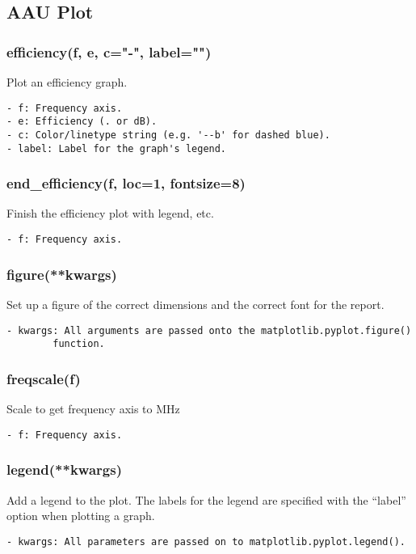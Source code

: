 \subsection{AAU Plot}
\subsubsection{efficiency(f, e, c="-", label="")}
Plot an efficiency graph.

\begin{verbatim}
- f: Frequency axis.
- e: Efficiency (. or dB).
- c: Color/linetype string (e.g. '--b' for dashed blue).
- label: Label for the graph's legend.
\end{verbatim}

\subsubsection{end\_efficiency(f, loc=1, fontsize=8)}
Finish the efficiency plot with legend, etc.

\begin{verbatim}
- f: Frequency axis.
\end{verbatim}

\subsubsection{figure(**kwargs)}
Set up a figure of the correct dimensions and the correct font for the
report.

\begin{verbatim}
- kwargs: All arguments are passed onto the matplotlib.pyplot.figure()
        function.
\end{verbatim}

\subsubsection{freqscale(f)}
Scale to get frequency axis to MHz

\begin{verbatim}
- f: Frequency axis.
\end{verbatim}

\subsubsection{legend(**kwargs)}
Add a legend to the plot. The labels for the legend are specified with the
``label'' option when plotting a graph.

\begin{verbatim}
- kwargs: All parameters are passed on to matplotlib.pyplot.legend().
\end{verbatim}

